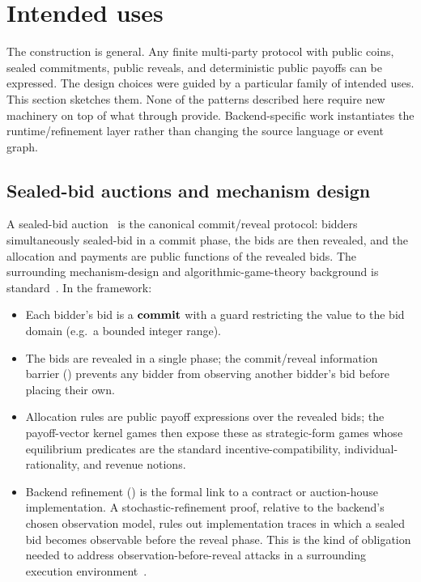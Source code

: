 \section{Intended uses}
\label{sec:applications}

The construction is general.  Any finite multi-party protocol with
public coins, sealed commitments, public reveals, and deterministic
public payoffs can be expressed.  The design choices were guided by a
particular family of intended uses.  This section sketches them.
None of the patterns described here require new machinery on top of
what  through  provide.
Backend-specific work instantiates the runtime/refinement layer rather
than changing the source language or event graph.

\subsection{Sealed-bid auctions and mechanism design}

A sealed-bid auction~\citep{Vickrey1961,Myerson1981OptimalAuction}
is the canonical commit/reveal protocol: bidders simultaneously
sealed-bid in a commit phase, the bids are then revealed, and the
allocation and payments are public functions of the revealed
bids.  The surrounding mechanism-design and algorithmic-game-theory
background is standard~\citep{MasColellWhinstonGreen1995,
NisanRoughgardenTardosVazirani2007}.  In the framework:
\begin{itemize}\itemsep1pt
\item Each bidder's bid is a $\mathbf{commit}$ with a guard restricting
  the value to the bid domain (e.g.\ a bounded integer range).
\item The bids are revealed in a single phase; the
  commit/reveal information barrier () prevents
  any bidder from observing another bidder's bid before placing
  their own.
\item Allocation rules are public payoff expressions over the
  revealed bids; the payoff-vector kernel games then expose these
  as strategic-form games whose equilibrium predicates are the
  standard incentive-compatibility, individual-rationality, and
  revenue notions.
\item Backend refinement () is the formal
  link to a contract or auction-house implementation.  A
  stochastic-refinement proof, relative to the backend's chosen
  observation model, rules out implementation traces in which a sealed
  bid becomes observable before the reveal phase.  This is the kind of
  obligation needed to address observation-before-reveal attacks in a
  surrounding execution environment~\citep{Daian2020Flash}.
\end{itemize}

